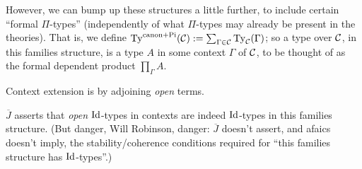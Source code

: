 \documentclass{amsart}
\newcommand{\Jbar}{\overline{J}}
\begin{document}
However, we can bump up these structures a little further, to include certain ``formal $\Pi$-types'' (independently of what $\Pi$-types may already be present in the theories).  That is, we define $\mathrm{Ty}^\mathrm{canon + Pi}(\mathcal{C}) := \sum_{\Gamma \in \mathcal{C}} \mathrm{Ty}_{\mathcal{C}}(\Gamma)$; so a type over $\mathcal{C}$, in this families structure, is a type $A$ in some context $\Gamma$ of $\mathcal{C}$, to be thought of as the formal dependent product $\prod_\Gamma A$.

Context extension is by adjoining \emph{open} terms.

$\Jbar$ asserts that \emph{open} $\mathrm{Id}$-types in contexts are indeed $\mathrm{Id}$-types in this families structure.  (But danger, Will Robinson, danger: $\Jbar$ doesn't assert, and afaics doesn't imply, the stability/coherence conditions required for ``this families structure has $\mathrm{Id}$-types''.)




\end{document}
